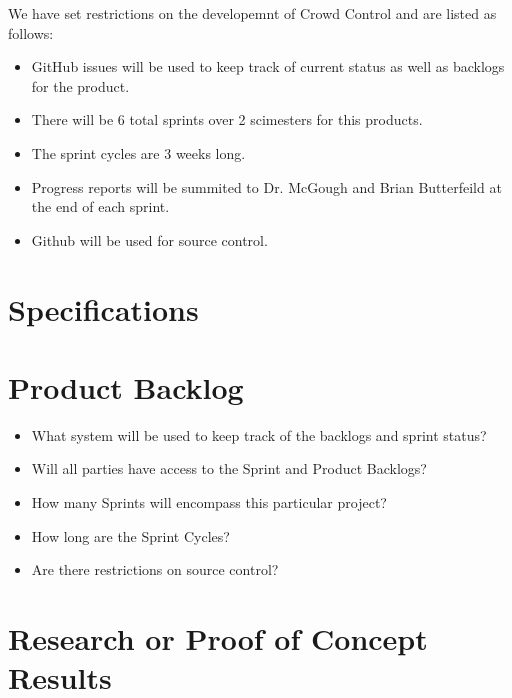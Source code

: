 We have set restrictions on the developemnt of Crowd Control and are listed as follows:
 
\begin{itemize}
\item GitHub issues will be used to keep track of current status as well as backlogs for the product.
\item There will be 6 total sprints over 2 scimesters for this products.
\item The sprint cycles are 3 weeks long.
\item Progress reports will be summited to Dr. McGough and Brian Butterfeild at the end of each sprint.
\item Github will be used for source control. 
\end{itemize}


\section{Specifications}

\section{Product Backlog}

 
\begin{itemize}
\item What system will be used to keep track of the backlogs and sprint status?
\item Will all parties have access to the Sprint and Product Backlogs?
\item How many Sprints will encompass this particular project?
\item How long are the Sprint Cycles?
\item Are there restrictions on source control? 
\end{itemize}


\section{Research or Proof of Concept Results}


